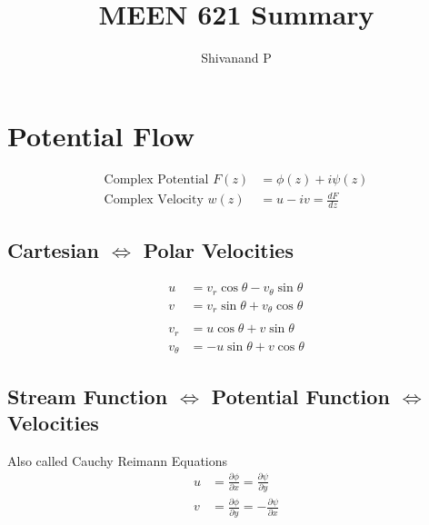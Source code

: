 \documentclass[12pt, letterpaper, notitlepage]{article}
\title{MEEN 621 Summary}
\author{Shivanand P}
\begin{document}
\sffamily

\maketitle
\renewcommand{\cftpartleader}{\cftdotfill{\cftdotsep}} %
\renewcommand{\cftsecleader}{\cftdotfill{\cftdotsep}}
\tableofcontents
\pagestyle{empty}

\newpage
\setcounter{page}{1}

\pagestyle{fancy}
\fancyhead{}    
\fancyfoot{}
\renewcommand{\headrulewidth}{0pt}
\renewcommand{\footrulewidth}{0pt}
\renewcommand{\arraystretch}{1.75}

\section{Potential Flow}
\begin{align*}
\text{Complex Potential\ } F(z) &= \phi(z) + i \psi(z) \\
\text{Complex Velocity\ } w(z) &= u - i v = \frac{dF}{dz} 
\end{align*}


\subsection{Cartesian $\Leftrightarrow$ Polar Velocities}
\begin{align*}
u &= v_r \cos{\theta} - v_{\theta} \sin{\theta} \\
v &= v_r \sin{\theta} + v_{\theta} \cos{\theta} \\ \\
v_r &= u \cos{\theta} + v \sin{\theta} \\
v_{\theta} &= -u \sin{\theta} + v \cos{\theta}
\end{align*}



\subsection{Stream Function $\Leftrightarrow$ Potential Function $\Leftrightarrow$ Velocities}
Also called Cauchy Reimann Equations
\begin{align*}
u &= \frac{\partial \phi}{\partial x} = \frac{\partial \psi}{\partial y} \\
v &= \frac{\partial \phi}{\partial y} = -\frac{\partial \psi}{\partial x}
\end{align*}
\end{document}
